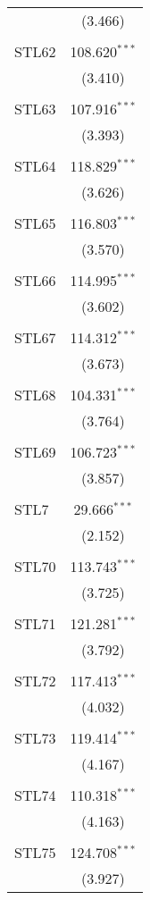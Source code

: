 \begin{table}[!htbp]
\begin{tabular}{@{\extracolsep{5pt}}lc}
  & (3.466) \\ 
  & \\ 
 STL62 & 108.620$^{***}$ \\ 
  & (3.410) \\ 
  & \\ 
 STL63 & 107.916$^{***}$ \\ 
  & (3.393) \\ 
  & \\ 
 STL64 & 118.829$^{***}$ \\ 
  & (3.626) \\ 
  & \\ 
 STL65 & 116.803$^{***}$ \\ 
  & (3.570) \\ 
  & \\ 
 STL66 & 114.995$^{***}$ \\ 
  & (3.602) \\ 
  & \\ 
 STL67 & 114.312$^{***}$ \\ 
  & (3.673) \\ 
  & \\ 
 STL68 & 104.331$^{***}$ \\ 
  & (3.764) \\ 
  & \\ 
 STL69 & 106.723$^{***}$ \\ 
  & (3.857) \\ 
  & \\ 
 STL7 & 29.666$^{***}$ \\ 
  & (2.152) \\ 
  & \\ 
 STL70 & 113.743$^{***}$ \\ 
  & (3.725) \\ 
  & \\ 
 STL71 & 121.281$^{***}$ \\ 
  & (3.792) \\ 
  & \\ 
 STL72 & 117.413$^{***}$ \\ 
  & (4.032) \\ 
  & \\ 
 STL73 & 119.414$^{***}$ \\ 
  & (4.167) \\ 
  & \\ 
 STL74 & 110.318$^{***}$ \\ 
  & (4.163) \\ 
  & \\ 
 STL75 & 124.708$^{***}$ \\ 
  & (3.927) \\ 

\end{tabular}
\end{table}
